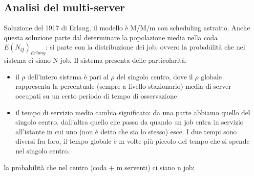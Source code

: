 \documentclass{article}
\begin{document}
\subsection{Analisi del multi-server}
Soluzione del 1917 di Erlang, il modello è M/M/m con scheduling astratto. Anche questa soluzione parte dal determinare la popolazione media nella coda $E(N_Q)_{Erlang}$: si parte con la distribuzione dei job, ovvero la probabilità che nel sistema ci siano N job. Il sistema presenta delle particolarità:
\begin{itemize}
\item il $\rho$ dell'intero sistema è pari al $\rho$ del singolo centro, dove il $\rho$ globale rappresenta la percentuale (sempre a livello stazionario) media di server occupati su un certo periodo di tempo di osservazione
\item il tempo di servizio medio cambia significato: da una parte abbiamo quello del singolo centro, dall'altra quello che passa da quando un job entra in servizio all'istante in cui uno (non è detto che sia lo stesso) esce. I due tempi sono diversi fra loro, il tempo globale è m volte più piccolo del tempo che si spende nel singolo centro.
\end{itemize}
la probabilità che nel centro (coda + m serventi) ci siano n job:
\end{document}
